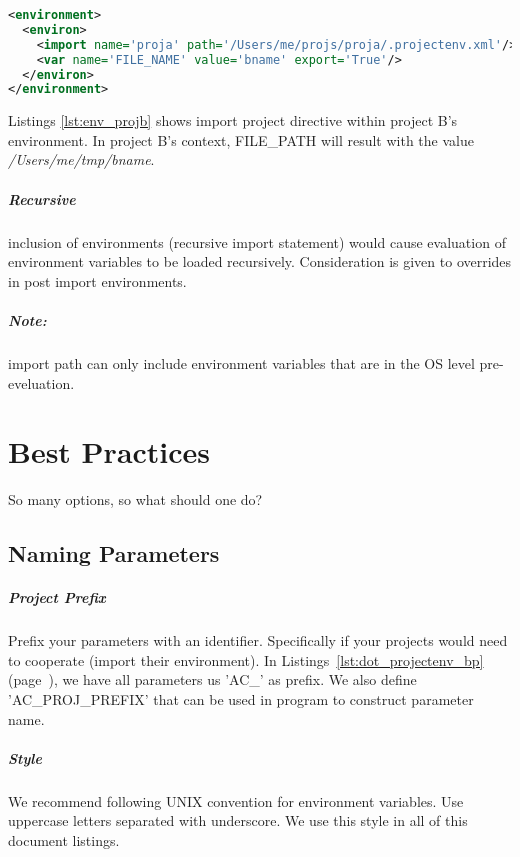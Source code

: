 \documentclass[design.tex]{subfiles}
\begin{document}
\begin{lstlisting}[language=XML, label=lst:env_projb, caption='Project B: /Users/me/projs/projb/.projectenv.xml']
<environment>
  <environ>
    <import name='proja' path='/Users/me/projs/proja/.projectenv.xml'/>
    <var name='FILE_NAME' value='bname' export='True'/>
  </environ>
</environment>
\end{lstlisting}

Listings \ref{lst:env_projb} shows import project directive within project B's environment.  In project B's context, FILE\_PATH will result with the value \emph{/Users/me/tmp/bname}.

\paragraph{Recursive} inclusion of environments (recursive import statement) would cause evaluation of environment variables to be loaded recursively.  Consideration is given to overrides in post import environments.

\paragraph{Note:}import path can only include environment variables that are in the OS level pre-eveluation.

\chapter{Best Practices}
So many options, so what should one do?

\section{Naming Parameters}
\paragraph{Project Prefix}
Prefix your parameters with an identifier.  Specifically if your projects would need to cooperate (import their environment).  In Listings~\ref{lst:dot_projectenv_bp} (page~\pageref{lst:dot_projectenv_bp}), we have all parameters us 'AC\_' as prefix.  We also define 'AC\_PROJ\_PREFIX' that can be used in program to construct parameter name.

\paragraph{Style} We recommend following UNIX convention for environment variables.  Use uppercase letters separated with underscore.  We use this style in all of this document listings.
\end{document}
